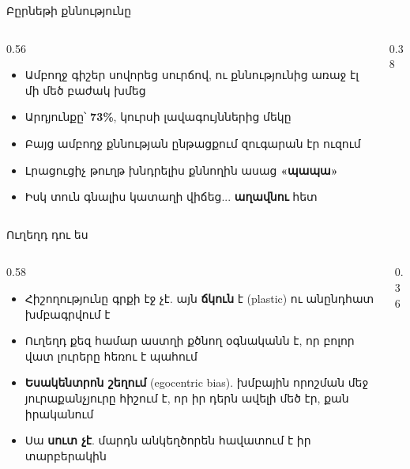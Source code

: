 \begin{frame}{Բըրնեթի քննությունը}
  \begin{columns}[c]
    \begin{column}{0.56\textwidth}
      \begin{itemize}
        \item Ամբողջ գիշեր սովորեց սուրճով, ու քննությունից առաջ էլ մի մեծ բաժակ խմեց 
        \item<2-> Արդյունքը՝ \textbf{73\%}, կուրսի լավագույններից մեկը
        \item<3-> Բայց ամբողջ քննության ընթացքում զուգարան էր ուզում
        \item<4-> Լրացուցիչ թուղթ խնդրելիս քննողին ասաց \textbf{«պապա»}
        \item<5-> Իսկ տուն գնալիս կատաղի վիճեց... \textbf{աղավնու} հետ 
      \end{itemize}
    \end{column}
    \begin{column}{0.38\textwidth}
      \centering
      \par\medskip
    \end{column}
  \end{columns}
\end{frame}


\begin{frame}{Ուղեղդ դու ես}
  \begin{columns}[c]
    \begin{column}{0.58\textwidth}
      \begin{itemize}
        \item Հիշողությունը գրքի էջ չէ. այն \textbf{ճկուն} է (plastic) ու անընդհատ խմբագրվում է
        \item Ուղեղդ քեզ համար աստղի քծնող օգնականն է, որ բոլոր վատ լուրերը հեռու է պահում
        \item<2-> \textbf{Եսակենտրոն շեղում} (egocentric bias). խմբային որոշման մեջ յուրաքանչյուրը հիշում է, որ իր դերն ավելի մեծ էր, քան իրականում
        \item<3-> Սա \textbf{սուտ չէ}. մարդն անկեղծորեն հավատում է իր տարբերակին
      \end{itemize}
    \end{column}
    \begin{column}{0.36\textwidth}
      \centering{}
    \end{column}
  \end{columns}
\end{frame}

